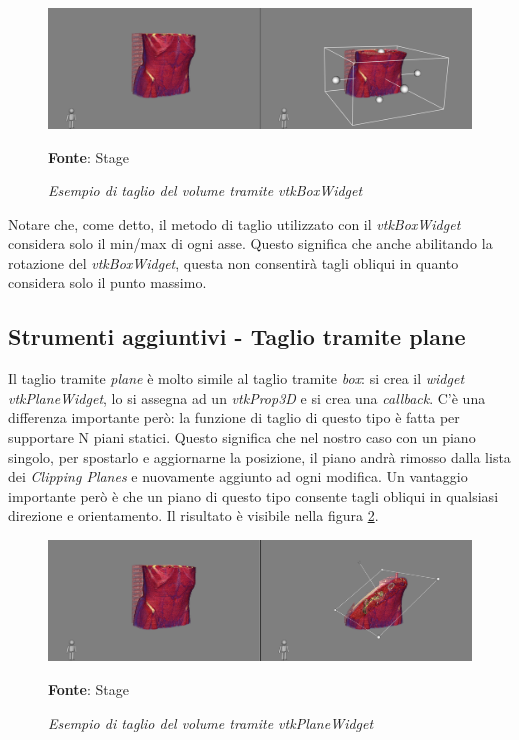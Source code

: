 \begin{figure}[h]
    \centering
    \includegraphics[width=1\textwidth]{immagini/svolgimento/boxcrop.png}
    \caption{\textit{Esempio di taglio del volume tramite vtkBoxWidget}}
    \textbf{Fonte}: Stage
    \label{fig: Taglio Box}
\end{figure}

Notare che, come detto, il metodo di taglio utilizzato con il \emph{vtkBoxWidget} considera solo il min/max di ogni asse. Questo significa che anche abilitando la rotazione del \emph{vtkBoxWidget}, questa non consentirà tagli obliqui in quanto considera solo il punto massimo. 

\subsection{Strumenti aggiuntivi - Taglio tramite plane}
Il taglio tramite \emph{plane} è molto simile al taglio tramite \emph{box}: si crea il \emph{widget vtkPlaneWidget}, lo si assegna ad un \emph{vtkProp3D} e si crea una \emph{callback}. C'è una differenza importante però: la funzione di taglio di questo tipo è fatta per supportare N piani statici. Questo significa che nel nostro caso con un piano singolo, per spostarlo e aggiornarne la posizione, il piano andrà rimosso dalla lista dei \emph{Clipping Planes} e nuovamente aggiunto ad ogni modifica. Un vantaggio importante però è che un piano di questo tipo consente tagli obliqui in qualsiasi direzione e orientamento. Il risultato è visibile nella figura \ref{fig: Taglio Plane}.

\begin{figure}[h]
    \centering
    \includegraphics[width=1\textwidth]{immagini/svolgimento/planecrop.png}
    \caption{\textit{Esempio di taglio del volume tramite vtkPlaneWidget}}
    \textbf{Fonte}: Stage
    \label{fig: Taglio Plane}
\end{figure}

